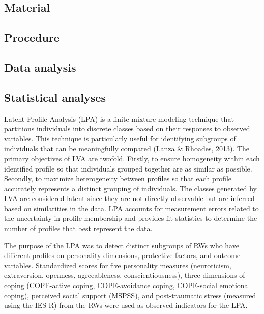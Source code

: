 \documentclass[
  man]{apa6}
\begin{document}
\hypertarget{material}{%
\subsection{Material}\label{material}}

\hypertarget{procedure}{%
\subsection{Procedure}\label{procedure}}

\hypertarget{data-analysis}{%
\subsection{Data analysis}\label{data-analysis}}

\hypertarget{statistical-analyses}{%
\subsection{Statistical analyses}\label{statistical-analyses}}

Latent Profile Analysis (LPA) is a finite mixture modeling technique that partitions individuals into discrete classes based on their responses to observed variables. This technique is particularly useful for identifying subgroups of individuals that can be meaningfully compared (Lanza \& Rhoades, 2013). The primary objectives of LVA are twofold. Firstly, to ensure homogeneity within each identified profile so that individuals grouped together are as similar as possible. Secondly, to maximize heterogeneity between profiles so that each profile accurately represents a distinct grouping of individuals. The classes generated by LVA are considered latent since they are not directly observable but are inferred based on similarities in the data. LPA accounts for measurement errors related to the uncertainty in profile membership and provides fit statistics to determine the number of profiles that best represent the data.

The purpose of the LPA was to detect distinct subgroups of RWs who have different profiles on personality dimensions, protective factors, and outcome variables. Standardized scores for five personality measures (neuroticism, extraversion, openness, agreeableness, conscientiousness), three dimensions of coping (COPE-active coping, COPE-avoidance coping, COPE-social emotional coping), perceived social support (MSPSS), and post-traumatic stress (measured using the IES-R) from the RWs were used as observed indicators for the LPA.
\end{document}
